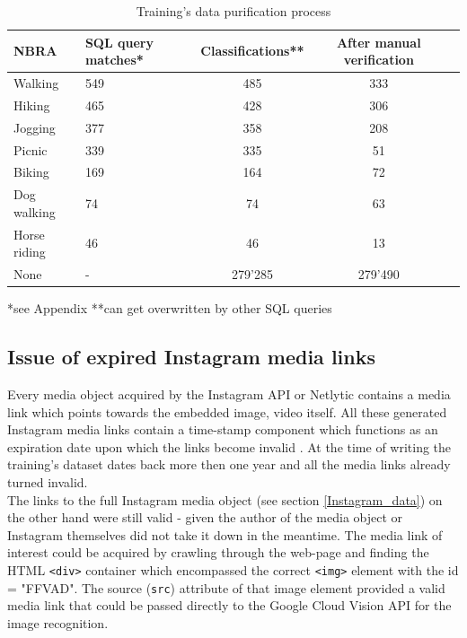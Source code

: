 \begin{table}[ht]
\begin{center}
\caption{Training's data purification process}\vspace{1ex}
\label{tab:trainingsdata}
\begin{tabular}{llccc}\hline
NBRA & SQL query matches* & Classifications** & After manual verification \\ \hline
Walking & 549 & 485 & 333 \\
Hiking & 465 & 428 & 306 \\
Jogging & 377 & 358 & 208 \\
Picnic & 339 & 335 & 51 \\
Biking & 169 & 164 & 72 \\
Dog walking & 74 & 74 & 63 \\
Horse riding & 46 & 46 & 13 \\
None & - & 279'285 & 279'490 \\ \hline
\end{tabular}
\newline
*see Appendix **can get overwritten by other SQL queries
\end{center}
\end{table}

\subsection{Issue of expired Instagram media links} \label{expired_media_links}
Every media object acquired by the Instagram API or Netlytic contains a media link which points towards the embedded image, video itself. All these generated Instagram media links contain a time-stamp component which functions as an expiration date upon which the links become invalid \parencite{Wayne2018}. At the time of writing the training's dataset dates back more then one year and all the media links already turned invalid.\\
The links to the full Instagram media object (see section \ref{Instagram_data}) on the other hand were still valid - given the author of the media object or Instagram themselves did not take it down in the meantime. The media link of interest could be acquired by crawling through the web-page and finding the HTML \texttt{<div>} container which encompassed the correct \texttt{<img>} element with the id = "FFVAD". The source (\texttt{src}) attribute of that image element provided a valid media link that could be passed directly to the Google Cloud Vision API for the image recognition.


